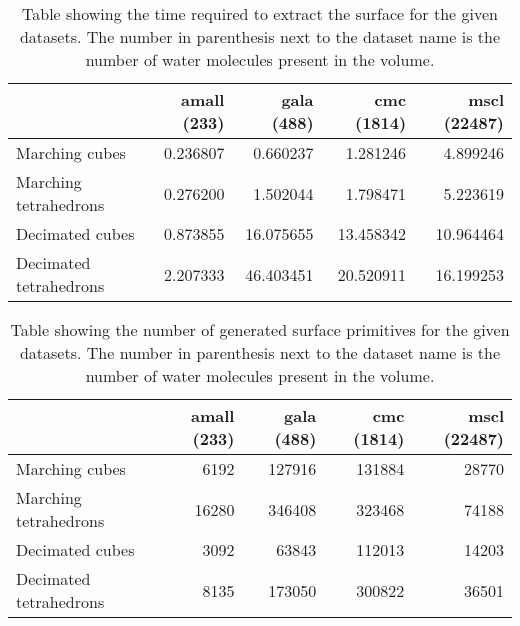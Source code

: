 \begin{table}
  \begin{tabular}{ | l | r | r | r | r | }
  \hline
                         & amall (233) & gala (488) & cmc (1814) & mscl (22487)  \\ \hline
  Marching cubes         &    0.236807 &   0.660237 &   1.281246 &     4.899246  \\ \hline
  Marching tetrahedrons  &    0.276200 &   1.502044 &   1.798471 &     5.223619  \\ \hline
  \hline
  Decimated cubes        &    0.873855 &  16.075655 &  13.458342 &    10.964464  \\ \hline
  Decimated tetrahedrons &    2.207333 &  46.403451 &  20.520911 &    16.199253  \\ \hline
  \end{tabular}
  \caption{Table showing the time required to extract the surface for the given
  datasets. The number in parenthesis next to the dataset name is the number of
  water molecules present in the volume.}
  \label{tab:appendix_surface_time}
\end{table}

\begin{table}
  \begin{tabular}{ | l | r | r | r | r | }
  \hline
                         & amall (233) & gala (488) & cmc (1814) & mscl (22487)  \\ \hline
  Marching cubes         &        6192 &     127916 &     131884 &        28770  \\ \hline
  Marching tetrahedrons  &       16280 &     346408 &     323468 &        74188  \\ \hline
  \hline
  Decimated cubes        &        3092 &      63843 &     112013 &        14203  \\ \hline
  Decimated tetrahedrons &        8135 &     173050 &     300822 &        36501  \\ \hline
  \end{tabular}
  \caption{Table showing the number of generated surface primitives for the
  given datasets. The number in parenthesis next to the dataset name is the
  number of water molecules present in the volume.}
  \label{tab:appendix_surface_count}
\end{table}




